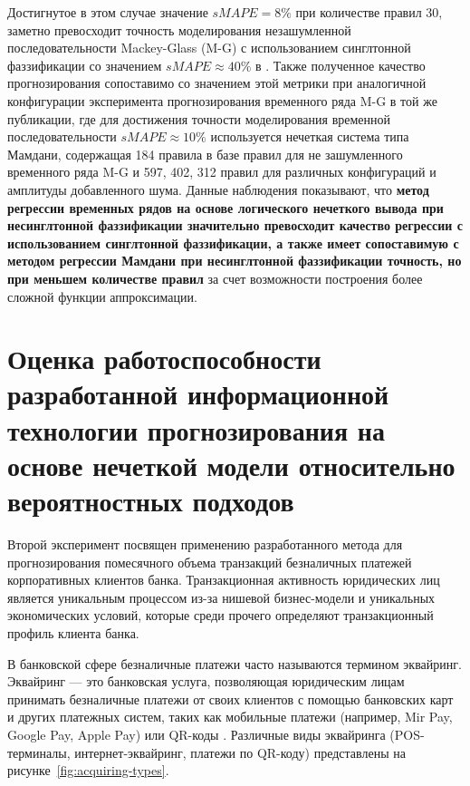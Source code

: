 Достигнутое в этом случае значение $sMAPE = 8\%$ при количестве правил 30, заметно превосходит точность моделирования незашумленной последовательности Mackey-Glass (M-G) с использованием синглтонной фаззификации со значением $sMAPE \approx 40\%$ в \cite{Pekaslan2020}. Также полученное качество прогнозирования сопоставимо со значением этой метрики при аналогичной конфигурации эксперимента прогнозирования временного ряда M-G в той же публикации, где для достижения точности моделирования временной последовательности $sMAPE \approx 10\%$ используется нечеткая система типа Мамдани, содержащая 184 правила в базе правил для не зашумленного временного ряда M-G и 597, 402, 312 правил для различных конфигураций и амплитуды добавленного шума. Данные наблюдения показывают, что \textbf{метод регрессии временных рядов на основе логического нечеткого вывода при несинглтонной фаззификации значительно превосходит качество регрессии с использованием синглтонной фаззификации, а также имеет сопоставимую с методом регрессии Мамдани при несинглтонной фаззификации точность, но при меньшем количестве правил} за счет возможности построения более сложной функции аппроксимации.

\section{Оценка работоспособности разработанной информационной технологии прогнозирования на основе нечеткой модели относительно вероятностных подходов}

Второй эксперимент посвящен применению разработанного метода для прогнозирования помесячного объема транзакций безналичных платежей корпоративных клиентов банка. Транзакционная активность юридических лиц является уникальным процессом из-за нишевой бизнес-модели и уникальных экономических условий, которые среди прочего определяют транзакционный профиль клиента банка.

В банковской сфере безналичные платежи часто называются термином эквайринг. Эквайринг --- это банковская услуга, позволяющая юридическим лицам принимать безналичные платежи от своих клиентов с помощью банковских карт и других платежных систем, таких как мобильные платежи (например, Mir Pay, Google Pay, Apple Pay) или QR-коды \cite{CBR161FZ}. Различные виды эквайринга (POS-терминалы, интернет-эквайринг, платежи по QR-коду) представлены на рисунке~\cref{fig:acquiring-types}.

